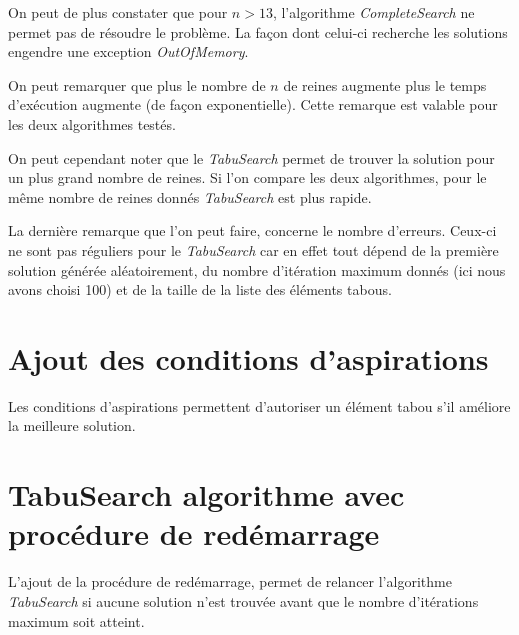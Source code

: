 \documentclass[a4paper,10pt]{article}
\begin{document}
On peut de plus constater que pour $n>13$, l'algorithme \emph{CompleteSearch} ne permet pas de résoudre le problème. La façon dont celui-ci recherche les solutions engendre une exception \emph{OutOfMemory}.

On peut remarquer que plus le nombre de $n$ de reines augmente plus le temps d'exécution augmente (de façon exponentielle). Cette remarque est valable pour les deux algorithmes testés.

On peut cependant noter que le \emph{TabuSearch} permet de trouver la solution pour un plus grand nombre de reines. Si l'on compare les deux algorithmes, pour le même nombre de reines donnés \emph{TabuSearch} est plus rapide.

La dernière remarque que l'on peut faire, concerne le nombre d'erreurs. Ceux-ci ne sont pas réguliers pour le \emph{TabuSearch} car en effet tout dépend de la première solution générée aléatoirement, du nombre d'itération maximum donnés (ici nous avons choisi 100) et de la taille de la liste des éléments tabous. 

\section{Ajout des conditions d'aspirations}
Les conditions d'aspirations permettent d'autoriser un élément tabou s'il améliore la meilleure solution.

\section{TabuSearch algorithme avec procédure de redémarrage}
L'ajout de la procédure de redémarrage, permet de relancer l'algorithme \emph{TabuSearch} si aucune solution n'est trouvée avant que le nombre d'itérations maximum soit atteint.
\end{document}
